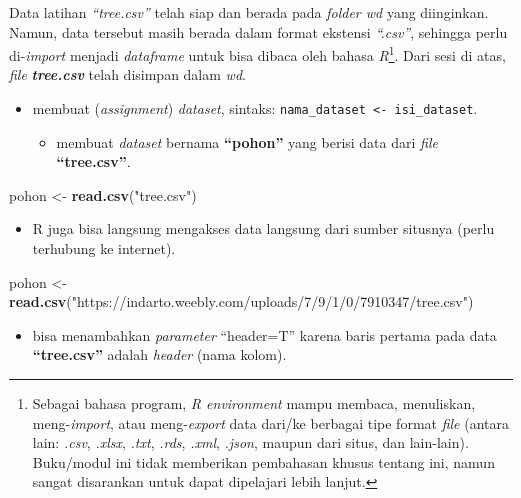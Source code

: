 \documentclass[
  12pt,
  a4paper,
]{scrbook}
\newenvironment{Shaded}{\begin{snugshade}}{\end{snugshade}}
\newcommand{\KeywordTok}[1]{\textcolor[rgb]{0.13,0.29,0.53}{\textbf{#1}}}
\newcommand{\NormalTok}[1]{#1}
\newcommand{\StringTok}[1]{\textcolor[rgb]{0.31,0.60,0.02}{#1}}
\providecommand{\tightlist}{%
  \setlength{\itemsep}{0pt}\setlength{\parskip}{0pt}}
\begin{document}
Data latihan \emph{``tree.csv''} telah siap dan berada pada \emph{folder
wd} yang diinginkan. Namun, data tersebut masih berada dalam format
ekstensi \emph{``.csv''}, sehingga perlu di-\emph{import} menjadi
\emph{dataframe} untuk bisa dibaca oleh bahasa \emph{R}\footnote{Sebagai
  bahasa program, \emph{R environment} mampu membaca, menuliskan,
  meng-\emph{import}, atau meng-\emph{export} data dari/ke berbagai tipe
  format \emph{file} (antara lain: \emph{.csv}, \emph{.xlsx},
  \emph{.txt}, \emph{.rds}, \emph{.xml}, \emph{.json}, maupun dari
  situs, dan lain-lain). Buku/modul ini tidak memberikan pembahasan
  khusus tentang ini, namun sangat disarankan untuk dapat dipelajari
  lebih lanjut.}. Dari sesi di atas, \emph{file}
\textbf{\emph{tree.csv}} telah disimpan dalam \emph{wd}.

\begin{itemize}
\tightlist
\item
  membuat (\emph{assignment}) \emph{dataset}, sintaks:
  \texttt{nama\_dataset\ \textless{}-\ isi\_dataset}.

  \begin{itemize}
  \tightlist
  \item
    membuat \emph{dataset} bernama \textbf{``pohon''} yang berisi data
    dari \emph{file} \textbf{``tree.csv''}.
  \end{itemize}
\end{itemize}

\begin{Shaded}
\begin{Highlighting}[]
\NormalTok{pohon <-}\StringTok{ }\KeywordTok{read.csv}\NormalTok{(}\StringTok{"tree.csv"}\NormalTok{)}
\end{Highlighting}
\end{Shaded}

\begin{itemize}
\tightlist
\item
  R juga bisa langsung mengakses data langsung dari sumber situsnya
  (perlu terhubung ke internet).
\end{itemize}

\begin{Shaded}
\begin{Highlighting}[]
\NormalTok{pohon <-}\StringTok{ }\KeywordTok{read.csv}\NormalTok{(}\StringTok{"https://indarto.weebly.com/uploads/7/9/1/0/7910347/tree.csv"}\NormalTok{)}
\end{Highlighting}
\end{Shaded}

\begin{itemize}
\tightlist
\item
  bisa menambahkan \emph{parameter} ``header=T'' karena baris pertama
  pada data \textbf{``tree.csv''} adalah \emph{header} (nama kolom).
\end{itemize}
\end{document}
